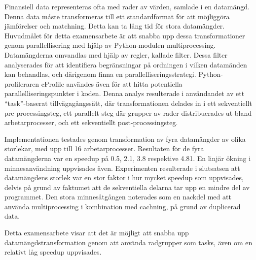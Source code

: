 Finansiell data representeras ofta med rader av värden, samlade i en datamängd. Denna data måste transformeras
till ett standardformat för att möjliggöra jämförelser och matchning. Detta kan ta lång tid för stora
datamängder. Huvudmålet för detta examensarbete är att snabba upp dessa transformationer genom parallellisering
med hjälp av Python-modulen multiprocessing. Datamängderna omvandlas med hjälp av regler, kallade filter.
Dessa filter analyserades för att identifiera begränsningar på ordningen i vilken datamänden kan behandlas,
och därigenom finna en parallelliseringsstrategi. Python-profileraren cProfile användes även för att hitta
potentiella parallelliseringspunkter i koden. Denna analys resulterade i användandet av ett ``task''-baserat
tillvägagångssätt, där transformationen delades in i ett sekventiellt pre-processingsteg, ett parallelt steg 
där grupper av rader distribuerades ut bland arbetarprocesser, och ett sekventiellt post-processingsteg.

Implementationen testades genom transformation av fyra datamängder av olika storlekar, med upp till 16 
arbetarprocesser. Resultaten för de fyra datamängderna var en speedup på 0.5, 2.1, 3.8 respektive 4.81.
En linjär ökning i minnesanvändning uppvisades även. Experimenten resulterade i slutsatsen att
datamängdens storlek var en stor faktor i hur mycket speedup som uppvisades, delvis på grund av faktumet
att de sekventiella delarna tar upp en mindre del av programmet. Den stora minnesåtgången noterades som
en nackdel med att använda multiprocessing i kombination med cachning, på grund av duplicerad data.

Detta examensarbete visar att det är möjligt att snabba upp datamängdstransformation genom att använda
radgrupper som tasks, även om en relativt låg speedup uppvisades.
